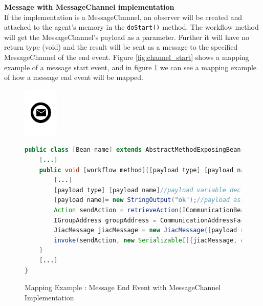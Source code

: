 \newpage
\textbf{Message with MessageChannel implementation}\\
If the implementation is a MessageChannel, an observer will be created and attached to the agent's memory in the \verb|doStart()| method.
The workflow method will get the MessageChannel's payload as a parameter. Further it will have no return type (void) and the result will be sent as a message to the specified MessageChannel of the end event. Figure \ref{fig:channel_start} shows a mapping example of a message start event, and in figure \ref{fig:channel_end} we can see a mapping example of how a message end event will be mapped. 
\begin{figure}[h]
\begin{minipage}[c]{0.28\textwidth}
\includegraphics{images/mapping/message_end.png}
\end{minipage}
\begin{minipage}[c]{0.72\textwidth}
\begin{lstlisting}[language = Java]
public class [Bean-name] extends AbstractMethodExposingBean{
	[...]
	public void [workflow method]([payload type] [payload name]){
		[...]
		[payload type] [payload name]//payload variable declaration
		[payload name]= new StringOutput("ok");//payload assignment
		Action sendAction = retrieveAction(ICommunicationBean.ACTION_SEND);
		IGroupAddress groupAddress = CommunicationAddressFactory.createGroupAddress([channel]);
		JiacMessage jiacMessage = new JiacMessage([payload name]);
		invoke(sendAction, new Serializable[]{jiacMessage, groupAddress});
	}
	[...]
}
\end{lstlisting}
\end{minipage}
\caption{Mapping Example : Message End Event with MessageChannel Implementation}%
\label{fig:channel_end}
\end{figure}
